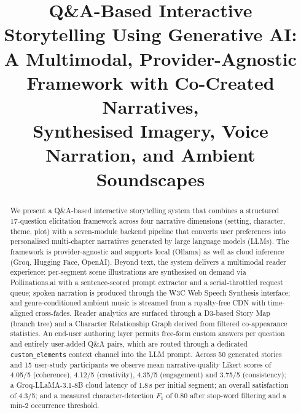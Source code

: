 \documentclass[conference,10pt,a4paper]{IEEEtran}
\begin{document}
\title{Q\&A-Based Interactive Storytelling Using Generative AI:\\
A Multimodal, Provider-Agnostic Framework with Co-Created Narratives,\\
Synthesised Imagery, Voice Narration, and Ambient Soundscapes}

\author{
\and
{}
}

\maketitle

\begin{abstract}
We present a Q\&A-based interactive storytelling system that combines a
structured 17-question elicitation framework across four narrative
dimensions (setting, character, theme, plot) with a seven-module backend
pipeline that converts user preferences into personalised multi-chapter
narratives generated by large language models (LLMs). The framework is
provider-agnostic and supports local (Ollama) as well as cloud
inference (Groq, Hugging Face, OpenAI). Beyond text, the system delivers
a multimodal reader experience: per-segment scene illustrations are
synthesised on demand via Pollinations.ai with a sentence-scored prompt
extractor and a serial-throttled request queue; spoken narration is
produced through the W3C Web Speech Synthesis interface; and
genre-conditioned ambient music is streamed from a royalty-free CDN
with time-aligned cross-fades. Reader analytics are surfaced through a
D3-based Story Map (branch tree) and a Character Relationship Graph
derived from filtered co-appearance statistics. An end-user authoring
layer permits free-form custom answers per question and entirely
user-added Q\&A pairs, which are routed through a dedicated
\texttt{custom\_elements} context channel into the LLM prompt. Across
50 generated stories and 15 user-study participants we observe mean
narrative-quality Likert scores of 4.05/5 (coherence), 4.12/5
(creativity), 4.35/5 (engagement) and 3.75/5 (consistency); a
Groq-LLaMA-3.1-8B cloud latency of 1.8\,s per initial segment; an
overall satisfaction of 4.3/5; and a measured character-detection
$F_1$ of 0.80 after stop-word filtering and a min-2 occurrence
threshold.
\end{abstract}
\end{document}
